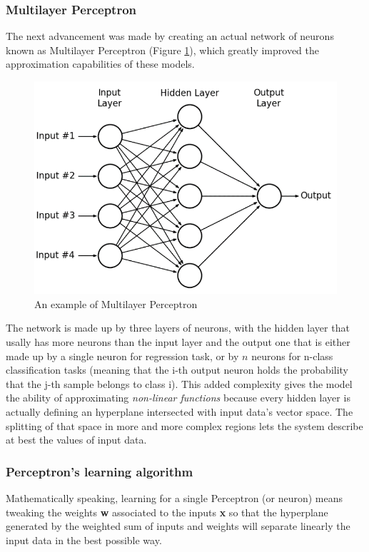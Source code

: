 \documentclass[11pt,a4paper,titlepage]{book}
\begin{document}
\subsubsection{Multilayer Perceptron}
The next advancement was made by creating an actual network of neurons known as Multilayer Perceptron (Figure \ref{mlp_example}), which greatly improved the approximation capabilities of these models. 
\begin{figure}[h]
    \includegraphics[scale=0.4]{imgs/ch_1/A-hypothetical-example-of-Multilayer-Perceptron-Network.png}
    \centering
    \caption{An example of Multilayer Perceptron}
    \label{mlp_example}
\end{figure}
The network is made up by three layers of neurons, with the hidden layer that usally has more neurons than the input layer and the output one that is either made up by a single neuron for regression task, or by $n$ neurons for n-class classification tasks (meaning that the i-th output neuron holds the probability that the j-th sample belongs to class i).
\newline
\newline
This added complexity gives the model the ability of approximating \textit{non-linear functions} because every hidden layer is actually defining an hyperplane intersected with input data's vector space. The splitting of that space in more and more complex regions lets the system describe at best the values of input data.
\subsubsection{Perceptron's learning algorithm}
Mathematically speaking, learning for a single Perceptron (or neuron) means tweaking the weights \textbf{w} associated to the inputs \textbf{x} so that the hyperplane generated by the weighted sum of inputs and weights will separate linearly the input data in the best possible way.
\end{document}
